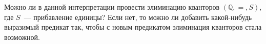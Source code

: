 Можно ли в данной интерпретации провести элиминацию кванторов $(\mathbb{Q}, =, S)$, где $S$~--- прибавление единицы? Если
нет, то можно ли добавить какой-нибудь выразимый предикат так, чтобы с новым предикатом элиминация кванторов стала возможной.